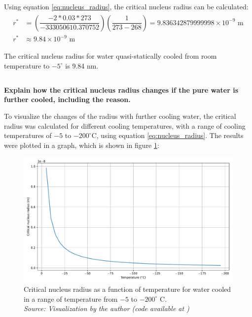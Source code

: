 Using equation \ref{eq:nucleus_radius}, the critical nucleus radius can be calculated:
\begin{align}
  \label{eq:radius}
  \begin{split}
    r^*&=\left(\dfrac{-2*0.03*273}{-333050610.370752}\right)\left(\dfrac{1}{273-268}\right)=9.836342879999998\times 10^{-9}\text{ m} \\ 
    r^*&\approx 9.84\times 10^{-9} \text{ m}
  \end{split}
\end{align}

\begin{mdframed}
The critical nucleus radius for water quasi-statically cooled from room temperature to $-5^{\circ}$ is 9.84 nm.
\end{mdframed}


\subsection{}
\textbf{Explain how the critical nucleus radius changes if the pure water is
further cooled, including the reason.}

To visualize the changes of the radius with further cooling water, the critical radius was calculated for different cooling temperatures, with a range of cooling temperatures of $-5$ to $-200^{\circ}$C, using equation \ref{eq:nucleus_radius}. The results were plotted in a graph, which is shown in figure \ref{fig:critical_radius}:

\begin{figure}[h]
    \centering
    \includegraphics[width=1\textwidth]{graficas/critical_radius.pdf}
    \caption{Critical nucleus radius as a function of temperature for water cooled in a range of temperature from $-5$ to $-200^{\circ}$ C. \\
    \textit{Source: Visualization by the author (code available at \citet{mygit})}}
    \label{fig:critical_radius}
\end{figure}

